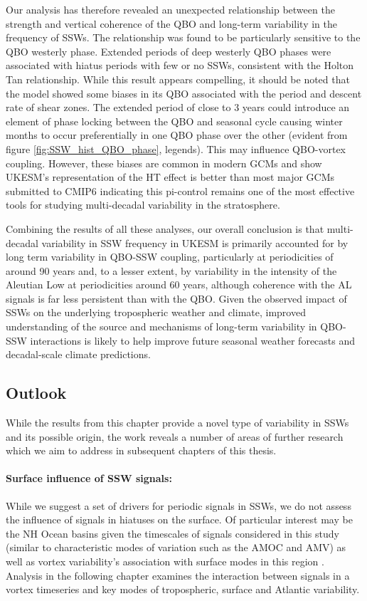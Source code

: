 Our analysis has therefore revealed an unexpected relationship between the strength and vertical coherence of the QBO and long-term variability in the frequency of SSWs. The relationship was found to be particularly sensitive to the QBO westerly phase. Extended periods of deep westerly QBO phases were associated with hiatus periods with few or no SSWs, consistent with the Holton Tan relationship. While this result appears compelling, it should be noted that the model showed some biases in its QBO associated with the period and descent rate of shear zones. The extended period of close to 3 years could introduce an element of phase locking between the QBO and seasonal cycle causing winter months to occur preferentially in one QBO phase over the other (evident from figure \ref{fig:SSW_hist_QBO_phase}, legends). This may influence QBO-vortex coupling. However, these biases are common in modern GCMs \citep{bushellEvaluation2020b} and \cite{raoModulation2019d} show UKESM's representation of the HT effect is better than most major GCMs submitted to CMIP6 indicating this pi-control remains one of the most effective tools for studying multi-decadal variability in the stratosphere.

Combining the results of all these analyses, our overall conclusion is that multi-decadal variability in SSW frequency in UKESM is primarily accounted for by long term variability in QBO-SSW coupling, particularly at periodicities of around 90 years and, to a lesser extent, by variability in the intensity of the Aleutian Low at periodicities around 60 years, although coherence with the AL signals is far less persistent than with the QBO. Given the observed impact of SSWs on the underlying tropospheric weather and climate, improved understanding of the source and mechanisms of long-term variability in QBO-SSW interactions is likely to help improve future seasonal weather forecasts and decadal-scale climate predictions.

\subsection*{Outlook}
While the results from this chapter provide a novel type of variability in SSWs and its possible origin, the work reveals a number of areas of further research which we aim to address in subsequent chapters of this thesis.

\paragraph{Surface influence of SSW signals:} While we suggest a set of drivers for periodic signals in SSWs, we do not assess the influence of signals in hiatuses on the surface. Of particular interest may be the NH Ocean basins given the timescales of signals considered in this study (similar to characteristic modes of variation such as the AMOC and AMV) as well as vortex variability's association with surface modes in this region \citep{baldwinStratospheric2001a}. Analysis in the following chapter examines the interaction between signals in a vortex timeseries and key modes of tropospheric, surface and Atlantic variability.

